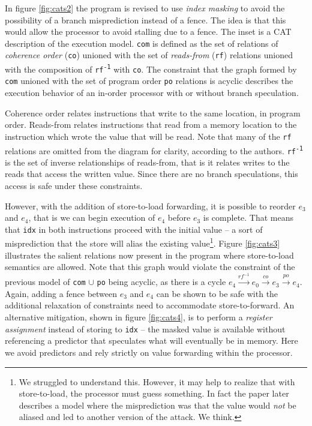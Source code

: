 \documentclass[11pt,conference]{IEEEtran}
\begin{document}
In figure \ref{fig:cats2} the program is revised to use \emph{index masking} to avoid the possibility of a branch misprediction instead of a fence.
The idea is that this would allow the processor to avoid stalling due to a fence.
The inset is a CAT description of the execution model.
\texttt{com} is defined as the set of relations of \emph{coherence order} (\texttt{co}) unioned with the set of \emph{reads-from} (\texttt{rf}) relations unioned with the composition of \texttt{rf\textsuperscript{-1}} with \texttt{co}.
The constraint that the graph formed by \texttt{com} unioned with the set of program order \texttt{po} relations is acyclic describes the execution behavior of an in-order processor with or without branch speculation.

Coherence order relates instructions that write to the same location, in program order.
Reads-from relates instructions that read from a memory location to the instruction which wrote the value that will be read.
Note that many of the \texttt{rf} relations are omitted from the diagram for clarity, according to the authors.
\texttt{rf\textsuperscript{-1}} is the set of inverse relationships of reads-from, that is it relates writes to the reads that access the written value.
Since there are no branch speculations, this access is safe under these constraints.

However, with the addition of store-to-load forwarding, it is possible to reorder $e_3$ and $e_4$, that is we can begin execution of $e_4$ before $e_3$ is complete.
That means that \texttt{idx} in both instructions proceed with the initial value -- a sort of misprediction that the store will alias the existing value\footnote{
	We struggled to understand this.
	However, it may help to realize that with store-to-load, the processor must guess something.
	In fact the paper later describes a model where the misprediction was that the value would \emph{not} be aliased and led to another version of the attack.
	We think.
}.
Figure \ref{fig:cats3} illustrates the salient relations now present in the program where store-to-load semantics are allowed.
Note that this graph would violate the constraint of the previous model of \texttt{com} $\cup$ \texttt{po} being acyclic, as there is a cycle $e_4\xrightarrow{rf^{-1}}e_0\xrightarrow{co}e_3\xrightarrow{po}e_4$.
Again, adding a fence between $e_3$ and $e_4$ can be shown to be safe with the additional relaxation of constraints need to accommodate store-to-forward.
An alternative mitigation, shown in figure \ref{fig:cats4}, is to perform a \emph{register assignment} instead of storing to \texttt{idx} -- the masked value is available without referencing a predictor that speculates what will eventually be in memory.
Here we avoid predictors and rely strictly on value forwarding within the processor.
\end{document}
